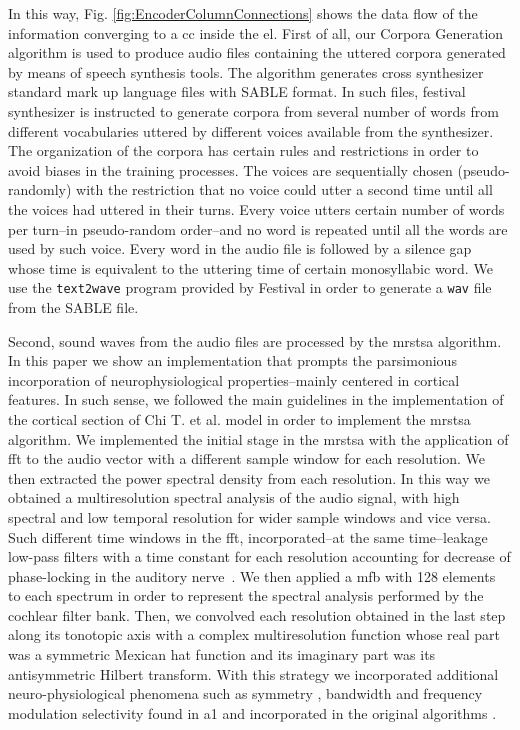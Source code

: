 \documentclass[10pt,journal,compsoc]{IEEEtran}
\begin{document}
In this way, Fig. \ref{fig:EncoderColumnConnections} shows the data flow of the information converging to a \gls{cc} inside the \gls{el}. First of all, our Corpora Generation algorithm is used to produce audio files containing the uttered corpora generated by means of speech synthesis tools. The algorithm generates cross synthesizer standard mark up language files with SABLE \cite{sable} format. In such files, \gls{festival} synthesizer is instructed to generate corpora from several number of words from different vocabularies uttered by different voices available from the synthesizer. The organization of the corpora has certain rules and restrictions in order to avoid biases in the training processes. The voices are sequentially chosen (pseudo-randomly) with the restriction that no voice could utter a second time until all the voices had uttered in their turns. Every voice utters certain number of words per turn--in pseudo-random order--and no word is repeated until all the words are used by such voice. Every word in the audio file is followed by a silence gap whose time is equivalent to the uttering time of certain monosyllabic word. We use the \texttt{text2wave} program provided by Festival in order to generate a \texttt{wav} file from the SABLE file.

Second, sound waves from the audio files are processed by the \gls{mrstsa} algorithm. In this paper we show an implementation that prompts the parsimonious incorporation of neurophysiological properties--mainly centered in cortical features. In such sense, we followed the main guidelines in the implementation of the cortical section of Chi T. et al. \cite{chi_2005} model in order to implement the \gls{mrstsa} algorithm. We implemented the initial stage in the \gls{mrstsa} with the application of \gls{fft} to the audio vector with a different sample window for each resolution. We then extracted the power spectral density from each resolution. In this way we obtained a multiresolution spectral analysis of the audio signal, with high spectral and low temporal resolution for wider sample windows and vice versa. Such different time windows in the \gls{fft}, incorporated--at the same time--leakage low-pass filters with a time constant for each resolution accounting for decrease of phase-locking in the auditory nerve~\cite{chi_2005}. We then applied a \gls{mfb} with 128 elements to each spectrum in order to represent the spectral analysis performed by the cochlear filter bank. Then, we convolved each resolution obtained in the last step along its tonotopic axis with a complex multiresolution function whose real part was a symmetric Mexican hat function and its imaginary part was its antisymmetric Hilbert transform. With this strategy we incorporated additional neuro-physiological phenomena such as symmetry \cite{shamma_1993}, bandwidth \cite{schreiner_1990} and frequency modulation selectivity \cite{shamma_1993,heil_1992,mendelson_1985} found in \gls{a1} and incorporated in the original algorithms \cite{wang_1995}.
\end{document}
